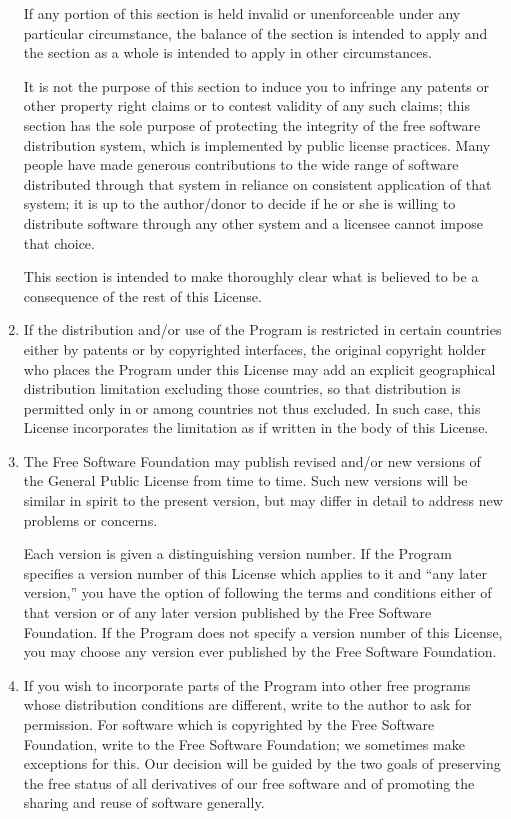 \documentclass[oneside,english]{book}
\begin{document}
\begin{enumerate}
If any portion of this section is held invalid or unenforceable under
any particular circumstance, the balance of the section is intended
to apply and the section as a whole is intended to apply in other
circumstances.

It is not the purpose of this section to induce you to infringe any
patents or other property right claims or to contest validity of any
such claims; this section has the sole purpose of protecting the integrity
of the free software distribution system, which is implemented by
public license practices. Many people have made generous contributions
to the wide range of software distributed through that system in reliance
on consistent application of that system; it is up to the author/donor
to decide if he or she is willing to distribute software through any
other system and a licensee cannot impose that choice.

This section is intended to make thoroughly clear what is believed
to be a consequence of the rest of this License.

\item If the distribution and/or use of the Program is restricted in certain
countries either by patents or by copyrighted interfaces, the original
copyright holder who places the Program under this License may add
an explicit geographical distribution limitation excluding those countries,
so that distribution is permitted only in or among countries not thus
excluded. In such case, this License incorporates the limitation as
if written in the body of this License.
\item The Free Software Foundation may publish revised and/or new versions
of the General Public License from time to time. Such new versions
will be similar in spirit to the present version, but may differ in
detail to address new problems or concerns.


Each version is given a distinguishing version number. If the Program
specifies a version number of this License which applies to it and
``any later version,'' you have the option of following the terms
and conditions either of that version or of any later version published
by the Free Software Foundation. If the Program does not specify a
version number of this License, you may choose any version ever published
by the Free Software Foundation.

\item If you wish to incorporate parts of the Program into other free programs
whose distribution conditions are different, write to the author to
ask for permission. For software which is copyrighted by the Free
Software Foundation, write to the Free Software Foundation; we sometimes
make exceptions for this. Our decision will be guided by the two goals
of preserving the free status of all derivatives of our free software
and of promoting the sharing and reuse of software generally.
\end{enumerate}
\end{document}
